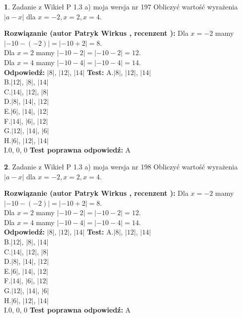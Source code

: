 \documentclass[12pt, a4paper]{article}
\theoremstyle{definition} %
\newtheorem{zad}{}
\newcommand{\zadStart}[1]{\begin{zad}#1\newline}
\newcommand{\zadStop}{\end{zad}}
\newcommand{\rozwStart}[2]{\noindent \textbf{Rozwiązanie (autor #1 , recenzent #2): }\newline}
\newcommand{\rozwStop}{\newline}
\newcommand{\odpStart}{\noindent \textbf{Odpowiedź:}\newline}
\newcommand{\odpStop}{\newline}
\newcommand{\testStart}{\noindent \textbf{Test:}\newline}
\newcommand{\testStop}{\newline}
\newcommand{\kluczStart}{\noindent \textbf{Test poprawna odpowiedź:}\newline}
\newcommand{\kluczStop}{\newline}
\begin{document}
\zadStart{Zadanie z Wikieł P 1.3 a) moja wersja nr 197}
Obliczyć wartość wyrażenia $|a - x|$ dla $x=-2,x=2,x=4$.
\zadStop
\rozwStart{Patryk Wirkus}{}
Dla $x = -2$ mamy $|-10 - (-2)| = |-10 + 2| = 8$.\\
Dla $x = 2$ mamy $|-10 - 2| = |-10 - 2| = 12$.\\
Dla $x = 4$ mamy $|-10 - 4| = |-10 - 4| = 14$.\\
\rozwStop
\odpStart
$|8|$, $|12|$, $|14|$
\odpStop
\testStart
A.$|8|$, $|12|$, $|14|$\\
B.$|12|$, $|8|$, $|14|$\\
C.$|14|$, $|12|$, $|8|$\\
D.$|8|$, $|14|$, $|12|$\\
E.$|6|$, $|14|$, $|12|$\\
F.$|14|$, $|6|$, $|12|$\\
G.$|12|$, $|14|$, $|6|$\\
H.$|6|$, $|12|$, $|14|$\\
I.$0$, $0$, $0$
\testStop
\kluczStart
A
\kluczStop



\zadStart{Zadanie z Wikieł P 1.3 a) moja wersja nr 198}
Obliczyć wartość wyrażenia $|a - x|$ dla $x=-2,x=2,x=4$.
\zadStop
\rozwStart{Patryk Wirkus}{}
Dla $x = -2$ mamy $|-10 - (-2)| = |-10 + 2| = 8$.\\
Dla $x = 2$ mamy $|-10 - 2| = |-10 - 2| = 12$.\\
Dla $x = 4$ mamy $|-10 - 4| = |-10 - 4| = 14$.\\
\rozwStop
\odpStart
$|8|$, $|12|$, $|14|$
\odpStop
\testStart
A.$|8|$, $|12|$, $|14|$\\
B.$|12|$, $|8|$, $|14|$\\
C.$|14|$, $|12|$, $|8|$\\
D.$|8|$, $|14|$, $|12|$\\
E.$|6|$, $|14|$, $|12|$\\
F.$|14|$, $|6|$, $|12|$\\
G.$|12|$, $|14|$, $|6|$\\
H.$|6|$, $|12|$, $|14|$\\
I.$0$, $0$, $0$
\testStop
\kluczStart
A
\kluczStop
\end{document}
